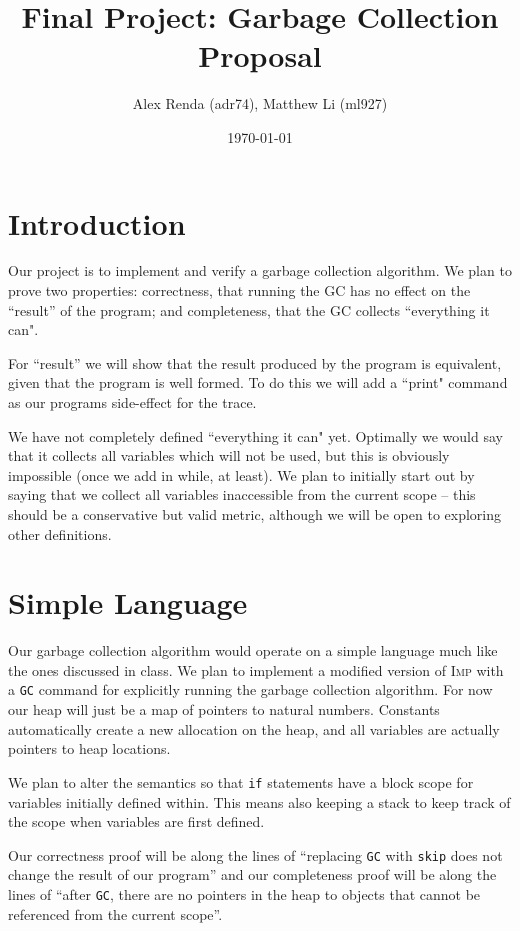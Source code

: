 \documentclass{article}
\title{Final Project: Garbage Collection Proposal}
\author{Alex Renda (adr74), Matthew Li (ml927)}
\date{\today}
\newcommand{\imp}{\textsc{Imp}\xspace}
\newcommand{\comskip}{\texttt{skip}\xspace}
\newcommand{\comgc}{\texttt{GC}\xspace}
\begin{document}
\maketitle

\section{Introduction}
Our project is to implement and verify a garbage collection algorithm. We plan to prove two properties: correctness, that running the GC has no effect on the ``result'' of the program; and completeness, that the GC collects ``everything it can". 

For ``result'' we will show that the result produced by the program is equivalent, given that the program is well formed. To do this we will add a ``print" command as our programs side-effect for the trace.

We have not completely defined ``everything it can" yet. Optimally we would say that it collects all variables which will not be used, but this is obviously impossible (once we add in while, at least). We plan to initially start out by saying that we collect all variables inaccessible from the current scope -- this should be a conservative but valid metric, although we will be open to exploring other definitions.

\section{Simple Language}
Our garbage collection algorithm would operate on a simple language much like the ones discussed in class. We plan to implement a modified version of \imp with a \comgc command for explicitly running the garbage collection algorithm. For now our heap will just be a map of pointers to natural numbers. Constants automatically create a new allocation on the heap, and all variables are actually pointers to heap locations.

We plan to alter the semantics so that \texttt{if} statements have a block scope for variables initially defined within. This means also keeping a stack to keep track of the scope when variables are first defined.

Our correctness proof will be along the lines of ``replacing \comgc with \comskip does not change the result of our program'' and our completeness proof will be along the lines of ``after \comgc, there are no pointers in the heap to objects that cannot be referenced from the current scope''.
\end{document}
